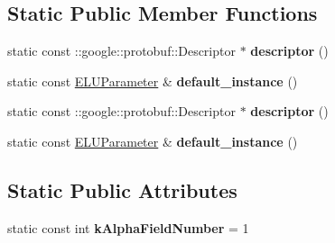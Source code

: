 \subsection*{Static Public Member Functions}
\begin{DoxyCompactItemize}
\item 
\mbox{\label{classcaffe_1_1_e_l_u_parameter_a05a90ae126e7aca7a03a43b8179ff39c}} 
static const \+::google\+::protobuf\+::\+Descriptor $\ast$ {\bfseries descriptor} ()
\item 
\mbox{\label{classcaffe_1_1_e_l_u_parameter_ac2a8a6073f6d275e64dc95f4b7dafaf9}} 
static const \mbox{\hyperlink{classcaffe_1_1_e_l_u_parameter}{E\+L\+U\+Parameter}} \& {\bfseries default\+\_\+instance} ()
\item 
\mbox{\label{classcaffe_1_1_e_l_u_parameter_a7ca51e6003fc334e6e6eba0bc30a13ca}} 
static const \+::google\+::protobuf\+::\+Descriptor $\ast$ {\bfseries descriptor} ()
\item 
\mbox{\label{classcaffe_1_1_e_l_u_parameter_ac8a84e8c5701219425d7519e363f1ca3}} 
static const \mbox{\hyperlink{classcaffe_1_1_e_l_u_parameter}{E\+L\+U\+Parameter}} \& {\bfseries default\+\_\+instance} ()
\end{DoxyCompactItemize}
\subsection*{Static Public Attributes}
\begin{DoxyCompactItemize}
\item 
\mbox{\label{classcaffe_1_1_e_l_u_parameter_a333d6d0edf1a5766e7fdcd45b495fba8}} 
static const int {\bfseries k\+Alpha\+Field\+Number} = 1
\end{DoxyCompactItemize}
